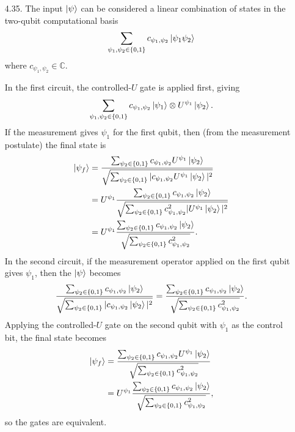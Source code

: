 \documentclass[a4paper,12pt]{article}
\begin{document}
\begin{enumerate}
    \item[4.35.] The input $\ket{\psi}$ can be considered a linear combination of states in the two-qubit computational basis
        \[
            \sum_{\psi_1, \psi_2 \in \{0, 1\}} c_{\psi_1, \psi_2} \ket{\psi_1 \psi_2}
        \]
        where $c_{\psi_1, \psi_2} \in \mathbb{C}$. \par
        In the first circuit, the controlled-$U$ gate is applied first, giving
        \[
            \sum_{\psi_1, \psi_2 \in \{0, 1\}} c_{\psi_1, \psi_2} \ket{\psi_1} \otimes U^{\psi_1} \ket{\psi_2}.
        \]
        If the measurement gives $\psi_1$ for the first qubit, then (from the measurement postulate) the final state is
        \begin{align*}
            \ket{\psi_f} &= \frac{\sum_{\psi_2 \in \{0, 1\}} c_{\psi_1, \psi_2} U^{\psi_1} \ket{\psi_2}}{\sqrt{\sum_{\psi_2 \in \{0, 1\}} |c_{\psi_1, \psi_2} U^{\psi_1} \ket{\psi_2}|^2}} \\
            &= U^{\psi_1} \frac{\sum_{\psi_2 \in \{0, 1\}} c_{\psi_1, \psi_2} \ket{\psi_2}}{\sqrt{\sum_{\psi_2 \in \{0, 1\}} c_{\psi_1, \psi_2}^2 |U^{\psi_1} \ket{\psi_2}|^2}} \\
            &= U^{\psi_1} \frac{\sum_{\psi_2 \in \{0, 1\}} c_{\psi_1, \psi_2} \ket{\psi_2}}{\sqrt{\sum_{\psi_2 \in \{0, 1\}} c_{\psi_1, \psi_2}^2}}.
        \end{align*}
        In the second circuit, if the measurement operator applied on the first qubit gives $\psi_1$, then the $\ket{\psi}$ becomes
        \begin{align*}
            \frac{\sum_{\psi_2 \in \{0, 1\}} c_{\psi_1, \psi_2} \ket{\psi_2}}{\sqrt{\sum_{\psi_2 \in \{0, 1\}} |c_{\psi_1, \psi_2} \ket{\psi_2}|^2}} = \frac{\sum_{\psi_2 \in \{0, 1\}} c_{\psi_1, \psi_2} \ket{\psi_2}}{\sqrt{\sum_{\psi_2 \in \{0, 1\}} c_{\psi_1, \psi_2}^2}}.
        \end{align*}
        Applying the controlled-$U$ gate on the second qubit with $\psi_1$ as the control bit, the final state becomes
        \begin{align*}
            \ket{\psi_f} &= \frac{\sum_{\psi_2 \in \{0, 1\}} c_{\psi_1, \psi_2} U^{\psi_1} \ket{\psi_2}}{\sqrt{\sum_{\psi_2 \in \{0, 1\}} c_{\psi_1, \psi_2}^2}} \\
            &= U^{\psi_1} \frac{\sum_{\psi_2 \in \{0, 1\}} c_{\psi_1, \psi_2} \ket{\psi_2}}{\sqrt{\sum_{\psi_2 \in \{0, 1\}} c_{\psi_1, \psi_2}^2}},
        \end{align*}
        so the gates are equivalent.

\end{enumerate}
\end{document}
